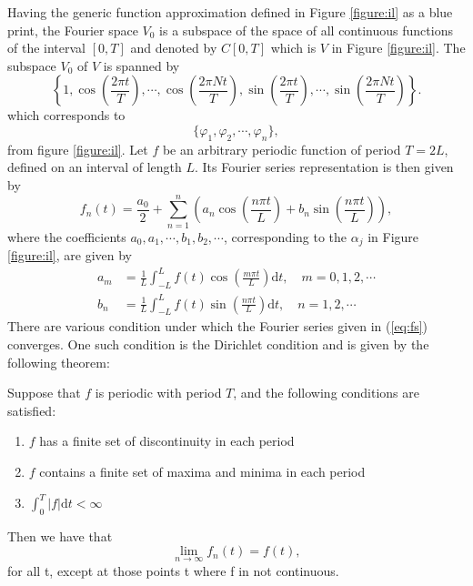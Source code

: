 \documentclass[../Main/thesis.tex]{subfiles}
\begin{document}
\justify
Having the generic function approximation defined in Figure \ref{figure:il} as a blue print, the Fourier space $V_{0}$ is a subspace of the space of all continuous functions of the interval $[0, T]$ and denoted by $C[0,T] $ which is $V$ in Figure \ref{figure:il}. The subspace $V_{0}$ of $V$ is spanned by 
\begin{equation}
\left\{1, \cos\left( \frac{2\pi t}{T} \right), \cdots,\cos\left( \frac{2\pi Nt}{T} \right), \sin\left( \frac{2\pi t}{T} \right), \cdots,\sin\left( \frac{2\pi Nt}{T} \right)   \right\}. \nonumber
\end{equation}
which corresponds to
\begin{equation}
\{\varphi_{1}, \varphi_{2}, \cdots, \varphi_{n}\}, \nonumber
\end{equation}
from figure \ref{figure:il}. Let $f$ be an arbitrary periodic function of period $T=2L$, defined on an interval of length $L$. Its Fourier series representation is then given by
\begin{equation}\label{eq:fs}
f_{n}(t) = \frac{a_{0}}{2} +\sum_{n=1}^{n}\left( a_{n} \cos\left( \frac{n\pi t}{L}\right) + b_{n} \sin\left( \frac{n\pi t}{L}\right)  \right), \end{equation}
where the coefficients $a_{0}, a_{1}, \cdots, b_{1}, b_{2},\cdots$, corresponding to the $\alpha_{j}$ in Figure \ref{figure:il}, are given by 
\begin{equation}\label{eq:fsc}
\begin{split}
a_{m} &= \frac{1}{L}\int_{-L}^{L}f(t)\cos\left( \frac{m\pi t}{L}\right) \mathrm{d}t,\quad m=0,1,2,\cdots\\
b_{n} &= \frac{1}{L}\int_{-L}^{L}f(t)\sin\left( \frac{n\pi t}{L}\right) \mathrm{d}t,\quad n=1,2,\cdots
\end{split}
\end{equation}
\justify
There are various condition under which the Fourier series given in (\ref{eq:fs}) converges. One such condition is the Dirichlet condition and is given by the following theorem:

\begin{theorem}
Suppose that $f$ is periodic with period $T$, and the following conditions are satisfied:
\begin{enumerate}
\item $f$ has a finite set of discontinuity in each period
\item $f$ contains a finite set of maxima and minima in each period
\item $\int_{0}^{T}|f|\mathrm{d}t <\infty$
\end{enumerate}

Then we have that 
\begin{equation}
\lim_{n\rightarrow \infty} f_{n}(t) = f(t) ,\nonumber
\end{equation}
for all t, except at those points t where f in not continuous.
\end{theorem}
\end{document}
